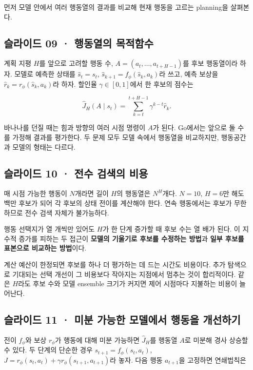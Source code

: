 \documentclass[11pt,a4paper]{article}
\begin{document}
먼저 모델 안에서 여러 행동열의 결과를 비교해 현재 행동을 고르는 planning을 살펴본다.\par

\subsection{슬라이드 09 · 행동열의 목적함수}

계획 지평 $H$를 앞으로 고려할 행동 수, $A=(a_t,\ldots,a_{t+H-1})$를 후보 행동열이라 하자. 모델로 예측한 상태를 $\hat s_t=s_t$, $\hat s_{k+1}=f_\phi(\hat s_k,a_k)$라 쓰고, 예측 보상을 $\hat r_k=r_\phi(\hat s_k,a_k)$라 하자. 할인율 $\gamma\in[0,1]$에서 한 후보의 점수는\par

\[
\widehat J_H(A\mid s_t)=
\sum_{k=t}^{t+H-1}\gamma^{k-t}\hat r_k.
\]

바나나를 던질 때는 힘과 방향의 여러 시점 명령이 $A$가 된다. Go에서는 앞으로 둘 수를 가정해 결과를 평가한다. 두 문제 모두 모델 속에서 행동열을 비교하지만, 행동공간과 모델의 형태는 다르다.\par

\subsection{슬라이드 10 · 전수 검색의 비용}

매 시점 가능한 행동이 $N$개라면 길이 $H$의 행동열은 $N^H$개다. $N=10$, $H=6$만 해도 백만 후보가 되어 각 후보의 상태 전이를 계산해야 한다. 연속 행동에서는 후보가 무한하므로 전수 검색 자체가 불가능하다.\par

행동 선택지가 열 개씩만 있어도 $H$가 한 단계 증가할 때 후보 수는 열 배가 된다. 이 지수적 증가를 피하는 두 접근이 \textbf{모델의 기울기로 후보를 수정하는 방법}과 \textbf{일부 후보를 표본으로 비교하는 방법}이다.\par

계산 예산이 한정되면 후보를 하나 더 평가하는 데 드는 시간도 비용이다. 추가 탐색으로 기대되는 선택 개선이 그 비용보다 작아지는 지점에서 멈추는 것이 합리적이다. 같은 $H$라도 후보 수와 모델 ensemble 크기가 커지면 제어 시점마다 지불하는 비용이 늘어난다.\par

\subsection{슬라이드 11 · 미분 가능한 모델에서 행동을 개선하기}

전이 $f_\phi$와 보상 $r_\phi$가 행동에 대해 미분 가능하면 $\widehat J_H$를 행동열 $A$로 미분해 경사 상승할 수 있다. 두 단계의 단순한 경우 $s_{t+1}=f_\phi(s_t,a_t)$, $J=r_\phi(s_t,a_t)+\gamma r_\phi(s_{t+1},a_{t+1})$라 놓자. 다음 행동 $a_{t+1}$을 고정하면 연쇄법칙은\par
\end{document}
